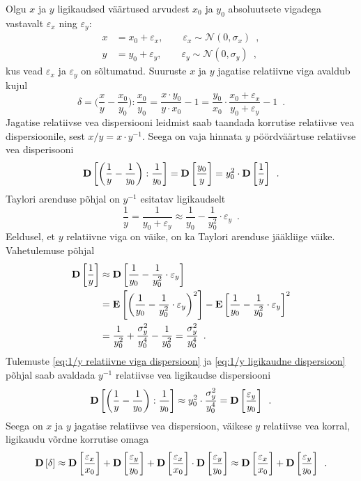 Olgu $x$ ja $y$ ligikaudsed väärtused arvudest $x_0$ ja $y_0$ absoluutsete vigadega vastavalt $\varepsilon_x$ ning $\varepsilon_y$:
\begin{align*}
    x&=x_0+\varepsilon_x ,\qquad \varepsilon_x\sim\mathcal{N}(0, \sigma_x) \enspace,\\
    y&=y_0+\varepsilon_y ,\qquad \varepsilon_y\sim\mathcal{N}(0, \sigma_y) \enspace,
\end{align*}
kus vead $\varepsilon_x$ ja $\varepsilon_y$ on sõltumatud. Suuruste $x$ ja $y$ jagatise relatiivne viga avaldub kujul
\begin{equation*}
    \delta=\biggl(\frac{x}{y}-\frac{x_0}{y_0}\biggr):\frac{x_0}{y_0}=\frac{x\cdot y_0}{y\cdot x_0}-1=\frac{y_0}{x_0}\cdot\frac{x_0+\varepsilon_x}{y_0+\varepsilon_y}-1 \enspace.
\end{equation*}
Jagatise relatiivse vea dispersiooni leidmist saab taandada korrutise relatiivse vea dispersioonile, sest $x/y=x\cdot y^{-1}$. Seega on vaja hinnata $y$ pöördväärtuse relatiivse vea disperisooni
\begin{equation}
    \label{eq:1/y relatiivne viga dispersioon}
    \operatorname*{\mathbf{D}}\left[\left(\frac{1}{y}-\frac{1}{y_0}\right):\frac{1}{y_0}\right]=\operatorname*{\mathbf{D}}\left[\frac{y_0}{y}\right]=y_0^2\cdot\operatorname*{\mathbf{D}}\left[\frac{1}{y}\right] \enspace.
\end{equation}
Taylori arenduse põhjal on $y^{-1}$ esitatav ligikaudselt
\begin{equation*}
    \frac{1}{y}=\frac{1}{y_0+\varepsilon_y}\approx\frac{1}{y_0}-\frac{1}{y_0^2}\cdot\varepsilon_y \enspace.
\end{equation*}
Eeldusel, et $y$ relatiivne viga on väike, on ka Taylori arenduse jääkliige väike.
Vahetulemuse põhjal
\begin{align}
    \operatorname*{\mathbf{D}}\left[\frac{1}{y}\right]
    &\approx\operatorname*{\mathbf{D}}\left[\frac{1}{y_0}-\frac{1}{y_0^2}\cdot\varepsilon_y\right] \nonumber\\
    &=\operatorname*{\mathbf{E}}\left[\left(\frac{1}{y_0}-\frac{1}{y_0^2}\cdot\varepsilon_y\right)^2\right]-\operatorname*{\mathbf{E}}\left[\frac{1}{y_0}-\frac{1}{y_0^2}\cdot\varepsilon_y\right]^2 \nonumber\\
    &=\frac{1}{y_0^2}+\frac{\sigma_y^2}{y_0^4}-\frac{1}{y_0^2}=\frac{\sigma_y^2}{y_0^4} \enspace. \label{eq:1/y ligikaudne dispersioon}
\end{align}
Tulemuste \eqref{eq:1/y relatiivne viga dispersioon} ja \eqref{eq:1/y ligikaudne dispersioon} põhjal saab avaldada $y^{-1}$ relatiivse vea ligikaudse dispersiooni
\begin{equation*}
    \operatorname*{\mathbf{D}}\left[\left(\frac{1}{y}-\frac{1}{y_0}\right):\frac{1}{y_0}\right]\approx y_0^2\cdot\frac{\sigma_y^2}{y_0^4}=\operatorname*{\mathbf{D}}\left[\frac{\varepsilon_y}{y_0}\right] \enspace.
\end{equation*}
Seega on $x$ ja $y$ jagatise relatiivse vea dispersioon, väikese $y$ relatiivse vea korral, ligikaudu võrdne korrutise omaga
\begin{equation}
    \label{eq:jagatis relatiivne viga dispersioon}
    \operatorname*{\mathbf{D}}\left[\delta\right]\approx\operatorname*{\mathbf{D}}\left[\frac{\varepsilon_x}{x_0}\right]+\operatorname*{\mathbf{D}}\left[\frac{\varepsilon_y}{y_0}\right]+\operatorname*{\mathbf{D}}\left[\frac{\varepsilon_x}{x_0}\right]\cdot\operatorname*{\mathbf{D}}\left[\frac{\varepsilon_y}{y_0}\right]\approx\operatorname*{\mathbf{D}}\left[\frac{\varepsilon_x}{x_0}\right]+\operatorname*{\mathbf{D}}\left[\frac{\varepsilon_y}{y_0}\right] \enspace.
\end{equation}

